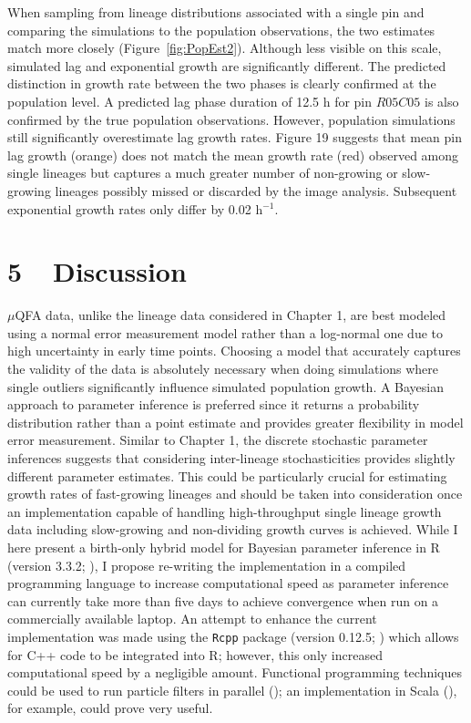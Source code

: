\documentclass{bioinfo}
\begin{document}
{When sampling from lineage distributions associated with a single pin and comparing the simulations to the population observations, the two estimates match more closely (Figure~\ref{fig:PopEst2}). Although less visible on this scale, simulated lag and exponential growth are significantly different. The predicted distinction in growth rate between the two phases is clearly confirmed at the population level. A predicted lag phase duration of 12.5 h for pin $R05C05$ is also confirmed by the true population observations. However, population simulations still significantly overestimate lag growth rates. Figure 19 suggests that mean pin lag growth (orange) does not match the mean growth rate (red) observed among single lineages but captures a much greater number of non-growing or slow-growing lineages possibly missed or discarded by the image analysis. Subsequent exponential growth rates only differ by 0.02 h$^{-1}$.

\vspace{-2em}
\section*{5 $\>\>$ Discussion}

$\mu$QFA data, unlike the lineage data considered in Chapter 1, are best modeled using a normal error measurement model rather than a log-normal one due to high uncertainty in early time points. Choosing a model that accurately captures the validity of the data is absolutely necessary when doing simulations where single outliers significantly influence simulated population growth. A Bayesian approach to parameter inference is preferred since it returns a probability distribution rather than a point estimate and provides greater flexibility in model error measurement. Similar to Chapter 1, the discrete stochastic parameter inferences suggests that considering inter-lineage stochasticities provides slightly different parameter estimates. This could be particularly crucial for estimating growth rates of fast-growing lineages and should be taken into consideration once an implementation capable of handling high-throughput single lineage growth data including slow-growing and non-dividing growth curves is achieved. While I here present a birth-only hybrid model for Bayesian parameter inference in R (version 3.3.2; \citealp{R16}), I propose re-writing the implementation in a compiled programming language to increase computational speed as parameter inference can currently take more than five days to achieve convergence when run on a commercially available laptop. An attempt to enhance the current implementation was made using the \texttt{Rcpp} package (version 0.12.5; \citealp{Eddelbuettel11}) which allows for C++ code to be integrated into R; however, this only increased computational speed by a negligible amount. Functional programming techniques could be used to run particle filters in parallel (\citealp{Wilkinson16}); an implementation in Scala (\citealp{Odersky06}), for example, could prove very useful. 

}
\end{document}

